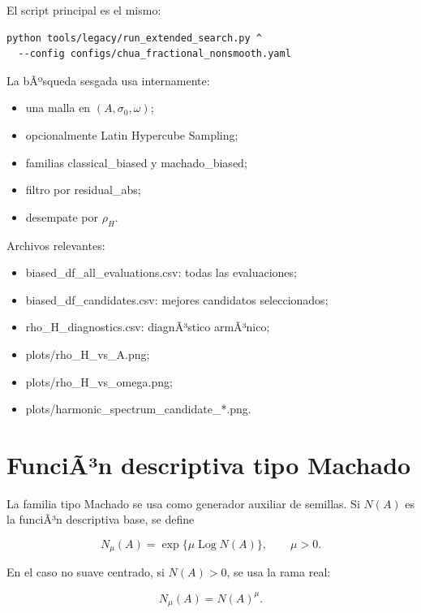 \documentclass[11pt]{article}
\DeclareRobustCommand{\codepath}[1]{\begingroup\Urlmuskip=0mu plus 2mu\path{#1}\endgroup}
\def\codepath#1{#1}%
\begin{document}
El script principal es el mismo:

\begin{lstlisting}
python tools/legacy/run_extended_search.py ^
  --config configs/chua_fractional_nonsmooth.yaml
\end{lstlisting}

La bÃºsqueda sesgada usa internamente:

\begin{itemize}
\item una malla en \((A,\sigma_0,\omega)\);
\item opcionalmente Latin Hypercube Sampling;
\item familias \codepath{classical_biased} y \codepath{machado_biased};
\item filtro por \codepath{residual_abs};
\item desempate por \(\rho_H\).
\end{itemize}

Archivos relevantes:

\begin{itemize}
\item \codepath{biased_df_all_evaluations.csv}: todas las evaluaciones;
\item \codepath{biased_df_candidates.csv}: mejores candidatos seleccionados;
\item \codepath{rho_H_diagnostics.csv}: diagnÃ³stico armÃ³nico;
\item \codepath{plots/rho_H_vs_A.png};
\item \codepath{plots/rho_H_vs_omega.png};
\item \codepath{plots/harmonic_spectrum_candidate_*.png}.
\end{itemize}

\section{FunciÃ³n descriptiva tipo Machado}

La familia tipo Machado se usa como generador auxiliar de semillas. Si \(N(A)\) es la funciÃ³n descriptiva base, se define

\begin{equation}
N_{\mu}(A)=\exp\{\mu\operatorname{Log}N(A)\},
\qquad \mu>0.
\end{equation}

En el caso no suave centrado, si \(N(A)>0\), se usa la rama real:

\begin{equation}
N_{\mu}(A)=N(A)^\mu.
\end{equation}
\end{document}
